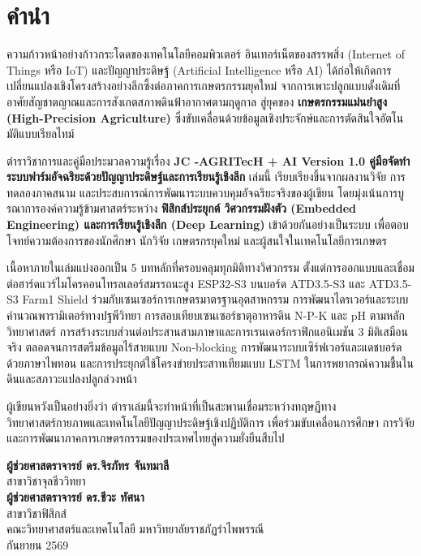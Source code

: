 \chapter*{คำนำ}

ความก้าวหน้าอย่างก้าวกระโดดของเทคโนโลยีคอมพิวเตอร์ อินเทอร์เน็ตของสรรพสิ่ง (Internet of Things หรือ IoT) และปัญญาประดิษฐ์ (Artificial Intelligence หรือ AI) ได้ก่อให้เกิดการเปลี่ยนแปลงเชิงโครงสร้างอย่างลึกซึ้งต่อภาคการเกษตรกรรมยุคใหม่ จากการเพาะปลูกแบบดั้งเดิมที่อาศัยสัญชาตญาณและการสังเกตสภาพดินฟ้าอากาศตามฤดูกาล สู่ยุคของ \textbf{เกษตรกรรมแม่นยำสูง (High-Precision Agriculture)} ซึ่งขับเคลื่อนด้วยข้อมูลเชิงประจักษ์และการตัดสินใจอัตโนมัติแบบเรียลไทม์

ตำราวิชาการและคู่มือประมวลความรู้เรื่อง \textbf{JC -AGRITecH + AI Version 1.0 คู่มือจัดทำระบบฟาร์มอัจฉริยะด้วยปัญญาประดิษฐ์และการเรียนรู้เชิงลึก} เล่มนี้ เรียบเรียงขึ้นจากผลงานวิจัย การทดลองภาคสนาม และประสบการณ์การพัฒนาระบบควบคุมอัจฉริยะจริงของผู้เขียน โดยมุ่งเน้นการบูรณาการองค์ความรู้ข้ามศาสตร์ระหว่าง \textbf{ฟิสิกส์ประยุกต์ วิศวกรรมฝังตัว (Embedded Engineering) และการเรียนรู้เชิงลึก (Deep Learning)} เข้าด้วยกันอย่างเป็นระบบ เพื่อตอบโจทย์ความต้องการของนักศึกษา นักวิจัย เกษตรกรยุคใหม่ และผู้สนใจในเทคโนโลยีการเกษตร

เนื้อหาภายในเล่มแบ่งออกเป็น 5 บทหลักที่ครอบคลุมทุกมิติทางวิศวกรรม ตั้งแต่การออกแบบและเชื่อมต่อฮาร์ดแวร์ไมโครคอนโทรลเลอร์สมรรถนะสูง ESP32-S3 บนบอร์ด ATD3.5-S3 และ ATD3.5-S3 Farm1 Shield ร่วมกับเซนเซอร์การเกษตรมาตรฐานอุตสาหกรรม การพัฒนาไดรเวอร์และระบบคำนวณพารามิเตอร์ทางปฐพีวิทยา การสอบเทียบเซนเซอร์ธาตุอาหารดิน N-P-K และ pH ตามหลักวิทยาศาสตร์ การสร้างระบบส่วนต่อประสานสามภาษาและการเรนเดอร์กราฟิกแอนิเมชัน 3 มิติเสมือนจริง ตลอดจนการสตรีมข้อมูลไร้สายแบบ Non-blocking การพัฒนาระบบเซิร์ฟเวอร์และแดชบอร์ดด้วยภาษาไพทอน และการประยุกต์ใช้โครงข่ายประสาทเทียมแบบ LSTM ในการพยากรณ์ความชื้นในดินและสภาวะแปลงปลูกล่วงหน้า

ผู้เขียนหวังเป็นอย่างยิ่งว่า ตำราเล่มนี้จะทำหน้าที่เป็นสะพานเชื่อมระหว่างทฤษฎีทางวิทยาศาสตร์กายภาพและเทคโนโลยีปัญญาประดิษฐ์เชิงปฏิบัติการ เพื่อร่วมขับเคลื่อนการศึกษา การวิจัย และการพัฒนาภาคการเกษตรกรรมของประเทศไทยสู่ความยั่งยืนสืบไป

\vspace{2.0cm}

\begin{flushright}
    \textbf{ผู้ช่วยศาสตราจารย์ ดร.จิรภัทร จันทมาลี}\\
    {\small สาขาวิชาจุลชีววิทยา}\\[3pt]
    \textbf{ผู้ช่วยศาสตราจารย์ ดร.ชีวะ ทัศนา}\\
    {\small สาขาวิชาฟิสิกส์}\\[5pt]
    คณะวิทยาศาสตร์และเทคโนโลยี มหาวิทยาลัยราชภัฏรำไพพรรณี\\
    กันยายน 2569
\end{flushright}
\cleardoublepage
